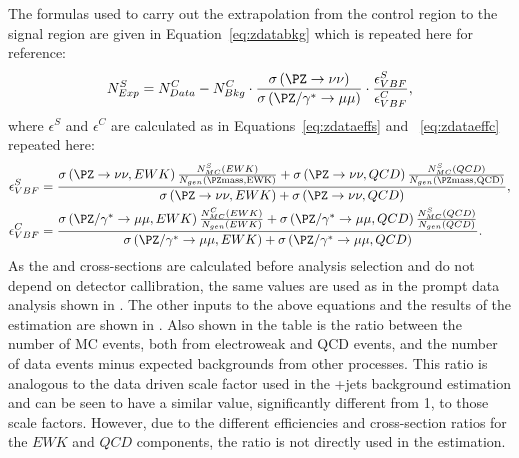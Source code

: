 The formulas used to carry out the extrapolation from the control region to the signal region are given in Equation~\ref{eq:zdatabkg} which is repeated here for reference:
\begin{equation}
  \label{eq:zdatabkgrep}
  N^{S}_{Exp}=N^{C}_{Data}-N^{C}_{Bkg}\cdot\frac{\sigma\left(\PZ\rightarrow\nu\nu\right)}{\sigma\left(\PZ/\gamma^{*}\rightarrow\mu\mu\right)}\cdot\frac{\epsilon^{S}_{VBF}}{\epsilon^{C}_{VBF}},
\end{equation}
where $\epsilon^{S}$ and $\epsilon^{C}$ are calculated as in Equations~\ref{eq:zdataeffs} and ~\ref{eq:zdataeffc} repeated here:
\begin{align}
  \label{eq:zdataeffsrep}
  \epsilon^{S}_{VBF}&=\frac{ \sigma\left(\PZ\rightarrow\nu\nu,EWK\right) \frac{N^{S}_{MC}\left(EWK\right)} {N_{gen}\left(\PZ \rm{mass},EWK\right)} + \sigma\left(\PZ\rightarrow\nu\nu,QCD\right) \frac{N^{S}_{MC}\left(QCD\right)} {N_{gen}\left(\PZ \rm{mass},QCD\right)} } {\sigma\left(\PZ\rightarrow\nu\nu,EWK\right) + \sigma\left(\PZ\rightarrow\nu\nu,QCD\right)},\\
  \label{eq:zdataeffcrep}
  \epsilon^{C}_{VBF}&=\frac{  \sigma\left(\PZ/\gamma^{*}\rightarrow\mu\mu,EWK\right) \frac{N^{C}_{MC}\left(EWK\right)} {N_{gen}\left(EWK\right)} + \sigma\left(\PZ/\gamma^{*}\rightarrow\mu\mu,QCD\right) \frac{N^{S}_{MC}\left(QCD\right)} {N_{gen}\left(QCD\right)}  }{\sigma\left(\PZ/\gamma^{*}\rightarrow\mu\mu,EWK\right)+\sigma\left(\PZ/\gamma^{*}\rightarrow\mu\mu,QCD\right)}.
\end{align}
As the \Zmumu and \Znunu cross-sections are calculated before analysis selection and do not depend on detector callibration, the same values are used as in the prompt data analysis shown in . The other inputs to the above equations and the results of the estimation are shown in . Also shown in the table is the ratio between the number of \ac{MC} events, both from electroweak and \ac{QCD} events, and the number of data events minus expected backgrounds from other processes. This ratio is analogous to the data driven scale factor used in the \PW+jets background estimation and can be seen to have a similar value, significantly different from 1, to those scale factors. However, due to the different efficiencies and cross-section ratios for the $EWK$ and $QCD$ components, the ratio is not directly used in the \Znunu estimation.


